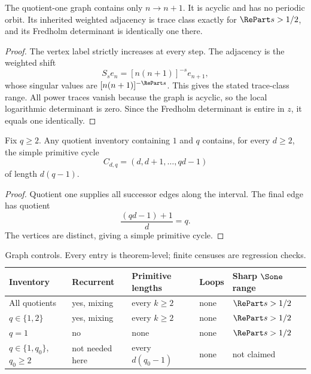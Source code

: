 \begin{proposition}
\label{prop:successor-only}
The quotient-one graph contains only \(n\to n+1\).  It is acyclic and has no
periodic orbit.  Its inherited weighted adjacency is trace class exactly for
\(\RePart s>1/2\), and its Fredholm determinant is identically one there.
\end{proposition}

\begin{proof}
The vertex label strictly increases at every step.  The adjacency is the
weighted shift
\[
 S_se_n=[n(n+1)]^{-s}e_{n+1},
\]
whose singular values are \([n(n+1)]^{-\RePart s}\).  This gives the stated
trace-class range.  All power traces vanish because the graph is acyclic, so
the local logarithmic determinant is zero.  Since the Fredholm determinant
is entire in \(z\), it equals one identically.
\end{proof}

\begin{proposition}
\label{prop:qfamily}
Fix \(q\ge2\).  Any quotient inventory containing \(1\) and \(q\) contains,
for every \(d\ge2\), the simple primitive cycle
\[
 C_{d,q}=(d,d+1,\ldots,qd-1)
\]
of length \(d(q-1)\).
\end{proposition}

\begin{proof}
Quotient one supplies all successor edges along the interval.  The final
edge has quotient
\[
 \frac{(qd-1)+1}{d}=q.
\]
The vertices are distinct, giving a simple primitive cycle.
\end{proof}

\begin{table}[t]
\centering
\small
\caption{Graph controls.  Every entry is theorem-level; finite censuses are
regression checks.}
\label{tab:controls}
\begin{tabularx}{\textwidth}{@{}L{0.24\textwidth}YYYY@{}}
\toprule
Inventory & Recurrent & Primitive lengths & Loops & Sharp \(\Sone\) range\\
\midrule
All quotients
 & yes, mixing & every \(k\ge2\) & none & \(\RePart s>1/2\)\\
\(q\in\{1,2\}\)
 & yes, mixing & every \(k\ge2\) & none & \(\RePart s>1/2\)\\
\(q=1\)
 & no & none & none & \(\RePart s>1/2\)\\
\(q\in\{1,q_0\}\), \(q_0\ge2\)
 & not needed here & every \(d(q_0-1)\) & none & not claimed\\
\bottomrule
\end{tabularx}
\end{table}

